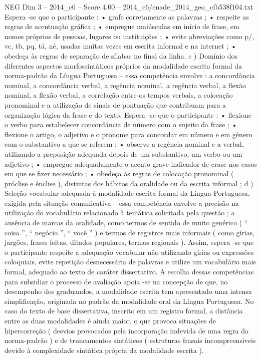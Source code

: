 \begin{textsample}{NEG Dim 3 – 2014\_c6 – Score 4.00 – 2014\_c6/enade\_2014\_geo\_cfb538f104.txt}
Espera -se que o participante : • grafe corretamente as palavras ; • respeite as regras de acentuação gráfica ; • empregue maiúsculas em início de frase, em nomes próprios de pessoas, lugares ou instituições ; • evite abreviações como p/, vc, tb, pq, tá, né, usadas muitas vezes em escrita informal e na internet ; • obedeça às regras de separação de sílabas no final da linha. c ) Domínio dos diferentes aspectos morfossintáticos próprios da modalidade escrita formal da norma-padrão da Língua Portuguesa – essa competência envolve : a concordância nominal, a concordância verbal, a regência nominal, a regência verbal, a flexão nominal, a flexão verbal, a correlação entre os tempos verbais, a colocação pronominal e a utilização de sinais de pontuação que contribuam para a organização lógica da frase e do texto.
Espera -se que o participante : • flexione o verbo para estabelecer concordância de número com o sujeito da frase ; • flexione o artigo, o adjetivo e o pronome para concordar em número e em gênero com o substantivo a que se referem ; • observe a regência nominal e a verbal, utilizando a preposição adequada depois de um substantivo, um verbo ou um adjetivo ; • empregue adequadamente o acento grave indicador de crase nos casos em que se fizer necessário ; • obedeça às regras de colocação pronominal ( próclise e ênclise ), distintas dos hábitos da oralidade ou da escrita informal ; d ) Seleção vocabular adequada à modalidade escrita formal da Língua Portuguesa, exigida pela situação comunicativa – essa competência envolve a precisão na utilização do vocabulário relacionado à temática solicitada pela questão ; a ausência de marcas da oralidade, como termos de sentido de muito genérico ( “ coisa ”, “ negócio ”, “ você ” ) e termos de registros mais informais ( como gírias, jargões, frases feitas, ditados populares, termos regionais ).
Assim, espera -se que o participante respeite a adequação vocabular não utilizando gírias ou expressões coloquiais, evite repetição desnecessária de palavras e utilize um vocabulário mais formal, adequado ao texto de caráter dissertativo.
A escolha dessas competências para subsidiar o processo de avaliação apoia -se na concepção de que, no desempenho dos graduandos, a modalidade escrita tem apresentado uma intensa simplificação, originada no padrão da modalidade oral da Língua Portuguesa.
No caso do texto de base dissertativa, inscrito em um registro formal, a distância entre as duas modalidades é ainda maior, o que provoca situações de hipercorreção ( desvios provocados pela incorporação indevida de uma regra da norma-padrão ) e de truncamentos sintáticos ( estruturas frasais incompreensíveis devido à complexidade sintática própria da modalidade escrita ).

\end{textsample}
